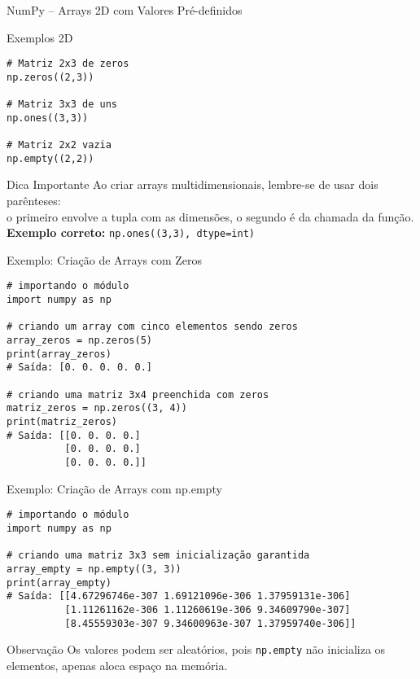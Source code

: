\begin{frame}[fragile]{NumPy – Arrays 2D com Valores Pré-definidos}
    \begin{exampleblock}{Exemplos 2D}
        \begin{verbatim}
# Matriz 2x3 de zeros
np.zeros((2,3))

# Matriz 3x3 de uns
np.ones((3,3))

# Matriz 2x2 vazia
np.empty((2,2))
\end{verbatim}
    \end{exampleblock}

    \begin{alertblock}{Dica Importante}
        Ao criar arrays multidimensionais, lembre-se de usar dois parênteses:\\
        o primeiro envolve a tupla com as dimensões, o segundo é da chamada da função.\\[0.3em]
        \textbf{Exemplo correto:} \texttt{np.ones((3,3), dtype=int)}
    \end{alertblock}

\end{frame}


\begin{frame}[fragile]{Exemplo: Criação de Arrays com Zeros}

    \begin{verbatim}
# importando o módulo
import numpy as np

# criando um array com cinco elementos sendo zeros
array_zeros = np.zeros(5)
print(array_zeros)
# Saída: [0. 0. 0. 0. 0.] 

# criando uma matriz 3x4 preenchida com zeros
matriz_zeros = np.zeros((3, 4)) 
print(matriz_zeros)
# Saída: [[0. 0. 0. 0.] 
          [0. 0. 0. 0.] 
          [0. 0. 0. 0.]]
\end{verbatim}

\end{frame}
\begin{frame}[fragile]{Exemplo: Criação de Arrays com np.empty}

    \begin{verbatim}
# importando o módulo
import numpy as np

# criando uma matriz 3x3 sem inicialização garantida
array_empty = np.empty((3, 3)) 
print(array_empty)
# Saída: [[4.67296746e-307 1.69121096e-306 1.37959131e-306]
          [1.11261162e-306 1.11260619e-306 9.34609790e-307] 
          [8.45559303e-307 9.34600963e-307 1.37959740e-306]]
\end{verbatim}

    \begin{alertblock}{Observação}
        Os valores podem ser aleatórios, pois \texttt{np.empty} não inicializa os elementos, apenas aloca espaço na memória.
    \end{alertblock}

\end{frame}

